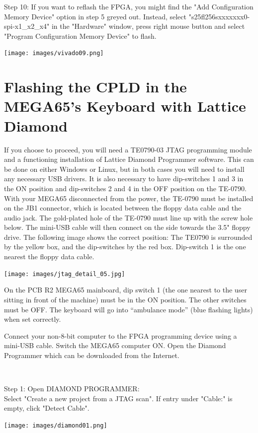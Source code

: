 \vspace{5mm}

\begin{minipage}{\linewidth}
Step 10: If you want to reflash the FPGA, you might find the
"Add Configuration Memory Device" option in step 5 greyed out.
Instead, select "s25fl256sxxxxxxx0-spi-x1\_x2\_x4"  in the "Hardware"
window, press right mouse button and select "Program Configuration
Memory Device" to flash.
  \\
  \begin{center}
    \texttt{[image: images/vivado09.png]}
  \end{center}
\end{minipage}


\section{Flashing the CPLD in the MEGA65's Keyboard with Lattice Diamond}


If you choose to proceed, you will need a TE0790-03 JTAG programming
module and a functioning installation of Lattice Diamond Programmer software.
This can be done on either Windows or Linux, but in both cases you will
need to install any necessary USB drivers. It is also necessary to have
dip-switches 1 and 3 in the ON position and dip-switches 2 and 4 in the
OFF position on the TE-0790. With your MEGA65 disconnected from the power,
the TE-0790 must be installed on the JB1 connector, which is located
between the floppy data cable and the audio jack.
The gold-plated hole of the TE-0790 must line up with the screw hole below.
The mini-USB cable will then connect on the side towards the 3.5" floppy drive.
The following image shows the correct position: The TE0790 is surrounded
by the yellow box, and the dip-switches by the red box. Dip-switch 1 is
the one nearest the floppy data cable.


\texttt{[image: images/jtag\_detail\_05.jpg]}


On the PCB R2 MEGA65 mainboard, dip switch 1 (the one nearest to the user
sitting in front of the machine) must be in the ON position. The other
switches must be OFF. The keyboard will go into ``ambulance mode''
(blue flashing lights) when set correctly.

Connect your non-8-bit computer to the FPGA programming device using a
mini-USB cable. Switch the MEGA65 computer ON. Open the Diamond Programmer
which can be downloaded from the Internet.

\\
\begin{minipage}{\linewidth}
Step 1: Open DIAMOND PROGRAMMER: \\
Select "Create a new project from a JTAG scan". If entry
under "Cable:" is empty, click "Detect Cable".
\\
  \begin{center}
  \texttt{[image: images/diamond01.png]}
  \end{center}
\end{minipage}

